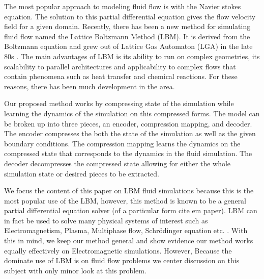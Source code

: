 \documentclass{article}
\begin{document}
The most popular approach to modeling fluid flow is with the Navier stokes equation. The solution to this partial differential equation gives the flow velocity field for a given domain. Recently, there has been a new method for simulating fluid flow named the Lattice Boltzmann Method (LBM). It is derived from the Boltzmann equation and grew out of Lattice Gas Automaton (LGA) in the late 80s \cite{mcnamara1988use}. The main advantages of LBM is its ability to run on complex geometries, its scalability to parallel architectures and applicability to complex flows that contain phenomena such as heat transfer and chemical reactions. For these reasons, there has been much development in the area.

Our proposed method works by compressing state of the simulation while learning the dynamics of the simulation on this compressed forms. The model can be broken up into three pieces, an encoder, compression mapping, and decoder. The encoder compresses the both the state of the simulation as well as the given boundary conditions. The compression mapping learns the dynamics on the compressed state that corresponds to the dynamics in the fluid simulation. The decoder decompresses the compressed state allowing for either the whole simulation state or desired pieces to be extracted.

We focus the content of this paper on LBM fluid simulations because this is the most popular use of the LBM, however, this method is known to be a general partial differential equation solver (of a particular form cite em paper). LBM can in fact be used to solve many physical systems of interest such as Electromagnetism, Plasma, Multiphase flow, Schrödinger equation etc. \cite{mendoza2010three} \cite{kim2008wavelet} \cite{zhong2006lattice} \cite{shan1993lattice}. With this in mind, we keep our method general and show evidence our method works equally effectively on Electromagnetic simulations. However, Because the dominate use of LBM is on fluid flow problems we center discussion on this subject with only minor look at this problem.
\end{document}
